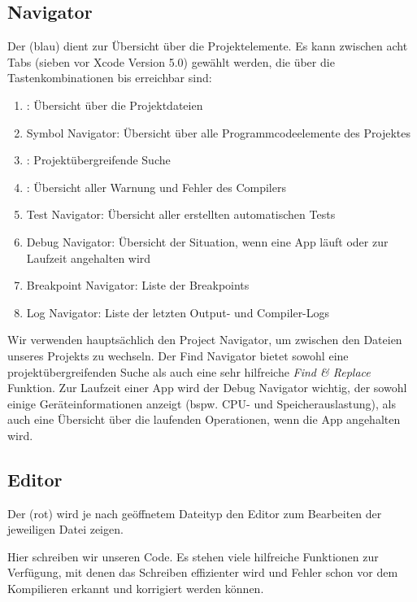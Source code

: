 \documentclass[parskip=half, final]{scrreprt}
\begin{document}
\subsection{Navigator}\label{sec:navigator}

Der  (blau) dient zur Übersicht über die Projektelemente. Es kann zwischen acht Tabs (sieben vor Xcode Version 5.0) gewählt werden, die über die Tastenkombinationen   bis  erreichbar sind:
\begin{enumerate}
\item {}: Übersicht über die Projektdateien
\item Symbol Navigator: Übersicht über alle Programmcodeelemente des Projektes
\item {}: Projektübergreifende Suche
\item {}: Übersicht aller Warnung und Fehler des Compilers
\item Test Navigator: Übersicht aller erstellten automatischen Tests
\item Debug Navigator: Übersicht der Situation, wenn eine App läuft oder zur Laufzeit angehalten wird
\item Breakpoint Navigator: Liste der Breakpoints
\item Log Navigator: Liste der letzten Output- und Compiler-Logs
\end{enumerate}
Wir verwenden hauptsächlich den Project Navigator, um zwischen den Dateien unseres Projekts zu wechseln. Der Find Navigator bietet sowohl eine projektübergreifenden Suche als auch eine sehr hilfreiche \emph{Find \& Replace} Funktion. Zur Laufzeit einer App wird der Debug Navigator wichtig, der sowohl einige Geräteinformationen anzeigt (bspw. CPU- und Speicherauslastung), als auch eine Übersicht über die laufenden Operationen, wenn die App angehalten wird.

\subsection{Editor}

Der  (rot) wird je nach geöffnetem Dateityp den Editor zum Bearbeiten der jeweiligen Datei zeigen.

Hier schreiben wir unseren Code. Es stehen viele hilfreiche Funktionen zur Verfügung, mit denen das Schreiben effizienter wird und Fehler schon vor dem Kompilieren erkannt und korrigiert werden können.
\end{document}
